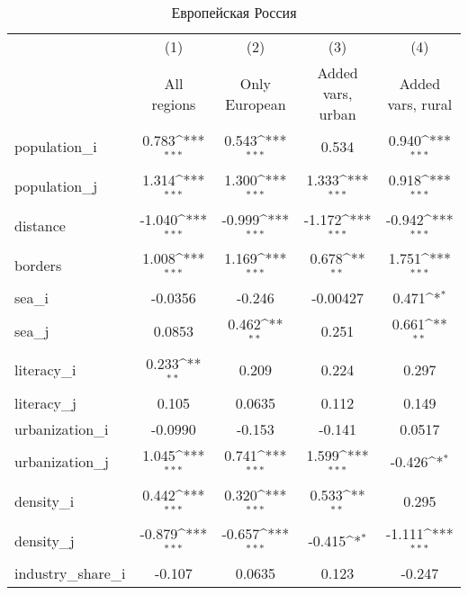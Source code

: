 {
\def\sym#1{\ifmmode^{#1}\else\(^{#1}\)\fi}
\begin{longtable}{l*{4}{c}}
\caption{Европейская Россия\label{table:eu}}\\
\hline\hline\endfirsthead\hline\endhead\hline\endfoot\endlastfoot
                    &\multicolumn{1}{c}{(1)}&\multicolumn{1}{c}{(2)}&\multicolumn{1}{c}{(3)}&\multicolumn{1}{c}{(4)}\\
                    &\multicolumn{1}{c}{All regions}&\multicolumn{1}{c}{Only European}&\multicolumn{1}{c}{Added vars, urban}&\multicolumn{1}{c}{Added vars, rural}\\
\hline
population\_i        &       0.783\sym{***}&       0.543\sym{***}&       0.534         &       0.940\sym{***}\\
population\_j        &       1.314\sym{***}&       1.300\sym{***}&       1.333\sym{***}&       0.918\sym{***}\\
distance            &      -1.040\sym{***}&      -0.999\sym{***}&      -1.172\sym{***}&      -0.942\sym{***}\\
borders             &       1.008\sym{***}&       1.169\sym{***}&       0.678\sym{**} &       1.751\sym{***}\\
sea\_i               &     -0.0356         &      -0.246         &    -0.00427         &       0.471\sym{*}  \\
sea\_j               &      0.0853         &       0.462\sym{**} &       0.251         &       0.661\sym{**} \\
literacy\_i          &       0.233\sym{**} &       0.209         &       0.224         &       0.297         \\
literacy\_j          &       0.105         &      0.0635         &       0.112         &       0.149         \\
urbanization\_i      &     -0.0990         &      -0.153         &      -0.141         &      0.0517         \\
urbanization\_j      &       1.045\sym{***}&       0.741\sym{***}&       1.599\sym{***}&      -0.426\sym{*}  \\
density\_i           &       0.442\sym{***}&       0.320\sym{***}&       0.533\sym{**} &       0.295         \\
density\_j           &      -0.879\sym{***}&      -0.657\sym{***}&      -0.415\sym{*}  &      -1.111\sym{***}\\
industry\_share\_i    &      -0.107         &      0.0635         &       0.123         &      -0.247         \\

\end{longtable}}
